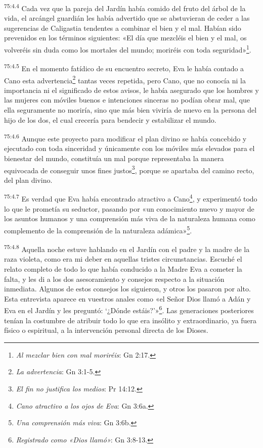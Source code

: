 \par
\textsuperscript{75:4.4} Cada vez que la pareja del Jardín había comido del fruto del árbol de la vida, el arcángel guardián les había advertido que se abstuvieran de ceder a las sugerencias de Caligastia tendentes a combinar el bien y el mal. Habían sido prevenidos en los términos siguientes: «El día que mezcléis el bien y el mal, os volveréis sin duda como los mortales del mundo; moriréis con toda seguridad»\footnote{\textit{Al mezclar bien con mal moriréis}: Gn 2:17.}.

\par
\textsuperscript{75:4.5} En el momento fatídico de su encuentro secreto, Eva le había contado a Cano esta advertencia\footnote{\textit{La advertencia}: Gn 3:1-5.} tantas veces repetida, pero Cano, que no conocía ni la importancia ni el significado de estos avisos, le había asegurado que los hombres y las mujeres con móviles buenos e intenciones sinceras no podían obrar mal, que ella seguramente no moriría, sino que más bien viviría de nuevo en la persona del hijo de los dos, el cual crecería para bendecir y estabilizar el mundo.

\par
\textsuperscript{75:4.6} Aunque este proyecto para modificar el plan divino se había concebido y ejecutado con toda sinceridad y únicamente con los móviles más elevados para el bienestar del mundo, constituía un mal porque representaba la manera equivocada de conseguir unos fines justos\footnote{\textit{El fin no justifica los medios}: Pr 14:12.}, porque se apartaba del camino recto, del plan divino.

\par
\textsuperscript{75:4.7} Es verdad que Eva había encontrado atractivo a Cano\footnote{\textit{Cano atractivo a los ojos de Eva}: Gn 3:6a.}, y experimentó todo lo que le prometía su seductor, pasando por «un conocimiento nuevo y mayor de los asuntos humanos y una comprensión más viva de la naturaleza humana como complemento de la comprensión de la naturaleza adámica»\footnote{\textit{Una comprensión más viva}: Gn 3:6b.}.

\par
\textsuperscript{75:4.8} Aquella noche estuve hablando en el Jardín con el padre y la madre de la raza violeta, como era mi deber en aquellas tristes circunstancias. Escuché el relato completo de todo lo que había conducido a la Madre Eva a cometer la falta, y les di a los dos asesoramiento y consejos respecto a la situación inmediata. Algunos de estos consejos los siguieron, y otros los pasaron por alto. Esta entrevista aparece en vuestros anales como «el Señor Dios llamó a Adán y Eva en el Jardín y les preguntó: `¿Dónde estáis?'»\footnote{\textit{Registrado como «Dios llamó»}: Gn 3:8-13.}. Las generaciones posteriores tenían la costumbre de atribuir todo lo que era insólito y extraordinario, ya fuera físico o espiritual, a la intervención personal directa de los Dioses.

